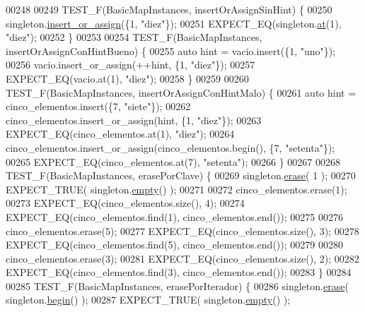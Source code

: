 \begin{DoxyCode}
00248 
00249 TEST\_F(BasicMapInstances, insertOrAssignSinHint) \{
00250     singleton.\hyperlink{classaed2_1_1map_a2ef6723c183916276b0afc4a4c721475_a2ef6723c183916276b0afc4a4c721475}{insert\_or\_assign}(\{1, \textcolor{stringliteral}{"diez"}\});
00251     EXPECT\_EQ(singleton.\hyperlink{classaed2_1_1map_a579c9179b42175c23a1013ac7f1b876c_a579c9179b42175c23a1013ac7f1b876c}{at}(1), \textcolor{stringliteral}{"diez"});
00252 \}
00253 
00254 TEST\_F(BasicMapInstances, insertOrAssignConHintBueno) \{
00255     \textcolor{keyword}{auto} hint = vacio.insert(\{1, \textcolor{stringliteral}{"uno"}\});
00256     vacio.insert\_or\_assign(++hint, \{1, \textcolor{stringliteral}{"diez"}\});
00257     EXPECT\_EQ(vacio.at(1), \textcolor{stringliteral}{"diez"});
00258 \}
00259 
00260 TEST\_F(BasicMapInstances, insertOrAssignConHintMalo) \{
00261     \textcolor{keyword}{auto} hint = cinco\_elementos.insert(\{7, \textcolor{stringliteral}{"siete"}\});
00262     cinco\_elementos.insert\_or\_assign(hint, \{1, \textcolor{stringliteral}{"diez"}\});
00263     EXPECT\_EQ(cinco\_elementos.at(1), \textcolor{stringliteral}{"diez"});
00264     cinco\_elementos.insert\_or\_assign(cinco\_elementos.begin(), \{7, \textcolor{stringliteral}{"setenta"}\});
00265     EXPECT\_EQ(cinco\_elementos.at(7), \textcolor{stringliteral}{"setenta"});
00266 \}
00267 
00268 TEST\_F(BasicMapInstances, erasePorClave) \{
00269     singleton.\hyperlink{classaed2_1_1map_ad8e796bf9c9c558e5ce6b61e116253fe_ad8e796bf9c9c558e5ce6b61e116253fe}{erase}( 1 );
00270     EXPECT\_TRUE( singleton.\hyperlink{classaed2_1_1map_a0dcb39283f4877ae59cb756ed1d0c048_a0dcb39283f4877ae59cb756ed1d0c048}{empty}() );
00271 
00272     cinco\_elementos.erase(1);
00273     EXPECT\_EQ(cinco\_elementos.size(), 4);
00274     EXPECT\_EQ(cinco\_elementos.find(1), cinco\_elementos.end());
00275 
00276     cinco\_elementos.erase(5);
00277     EXPECT\_EQ(cinco\_elementos.size(), 3);
00278     EXPECT\_EQ(cinco\_elementos.find(5), cinco\_elementos.end());
00279 
00280     cinco\_elementos.erase(3);
00281     EXPECT\_EQ(cinco\_elementos.size(), 2);
00282     EXPECT\_EQ(cinco\_elementos.find(3), cinco\_elementos.end());
00283 \}
00284 
00285 TEST\_F(BasicMapInstances, erasePorIterador) \{
00286     singleton.\hyperlink{classaed2_1_1map_ad8e796bf9c9c558e5ce6b61e116253fe_ad8e796bf9c9c558e5ce6b61e116253fe}{erase}( singleton.\hyperlink{classaed2_1_1map_a58a95705d54b3dda7f775ce5a22225cb_a58a95705d54b3dda7f775ce5a22225cb}{begin}() );
00287     EXPECT\_TRUE( singleton.\hyperlink{classaed2_1_1map_a0dcb39283f4877ae59cb756ed1d0c048_a0dcb39283f4877ae59cb756ed1d0c048}{empty}() );

\end{DoxyCode}
